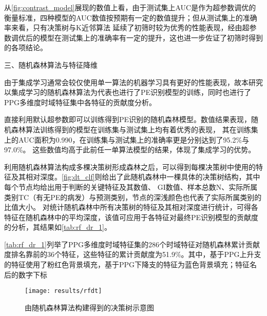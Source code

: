 从\autoref{fig:contrast_model}展现的数值上看，由于测试集上AUC是作为超参数调优的衡量标准，四种模型的AUC数值按预期有一定的数值提升；但从测试集上的准确率来看，只有决策树与K近邻算法
延续了初筛时较为优秀的性能表现，经由超参数调优后的模型在测试集上的准确率有一定的提升，这也进一步佐证了初筛时得到的各项结论。

三、随机森林算法与特征降维

由于集成学习通常会较仅使用单一算法的机器学习具有更好的性能表现，故本研究以集成学习的随机森林算法为代表也进行了PE识别模型的训练，同时也进行了
PPG多维度时域特征集中各特征的贡献度分析。

直接利用默认超参数即可以训练得到PE识别的随机森林模型\cite{scikit-learn}。数值结果表现，随机森林算法训练得到的模型在训练集与测试集上均有着优秀的表现，
其在训练集上的AUC面积为0.990，在训练集与测试集上的准确率更是分别达到了95.2\%与97.0\%。
这些数值均高于此前任一单算法模型的结果，体现了集成学习的优势。

利用随机森林算法构成多棵决策树形成森林之后，可以得到每棵决策树中使用的特征及其相对深度。\autoref{fig:dt_clf}则给出了此随机森林中一棵具体的决策树结构，其中每个节点均给出用于判断的关键特征及其数值、
GI数值、样本总数N、实际所属类别TC（有无PE的病发）与预测类别，节点的深浅颜色也代表了实际所属类别的比值大小。
对统计随机森林中所有决策树的特征及其相对深度进行统计，可得各特征在随机森林中的平均深度，该值可应用于各特征对最终PE识别模型的贡献度的分析，其结果如\autoref{tab:rf_dr_1}。

\autoref{tab:rf_dr_1}列举了PPG多维度时域特征集的286个时域特征对随机森林累计贡献度排名靠前的36个特征，这些特征的累计贡献度为51.9\%。其中，基于PPG上升支的特征使用了粉红色背景填充，基于PPG下降支的特征为蓝色背景填充；特征名后的数字下标

\begin{figure}[htbp]
    \centering
    \texttt{[image: results/rfdt]}
    \caption{\label{fig:dt_clf}由随机森林算法构建得到的决策树示意图}
\end{figure}

